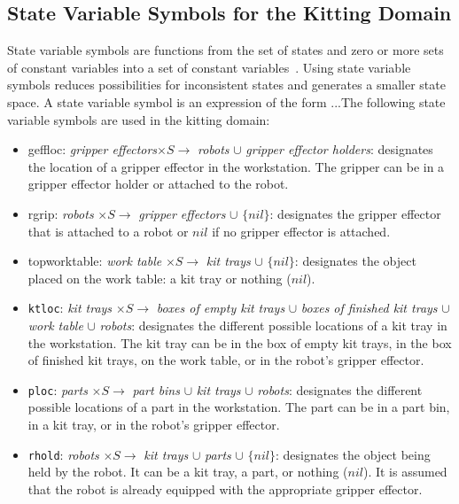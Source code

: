 \subsection{State Variable Symbols for the Kitting Domain}
State variable symbols are functions from the set of states and zero or more sets of constant variables into a set of constant variables~\cite{NAU.2004}. Using state variable symbols reduces possibilities for inconsistent states and generates a smaller state space. A state variable symbol is an expression of the form ...The following state variable symbols are used in the kitting domain:
\begin{itemize}
\item geffloc: \emph{gripper effectors}$\times S \rightarrow$ \emph{robots} $\cup$ \emph{gripper effector holders}: designates the location of a gripper effector in the workstation. The gripper can be in a gripper effector holder or attached to the robot.


\item rgrip: \emph{robots} $\times S \rightarrow$ \emph{gripper effectors} $\cup$ $\lbrace nil\rbrace$: designates the gripper effector that is attached to a robot or $nil$ if no gripper effector is attached.

\item topworktable: \emph{work table} $\times S \rightarrow$ \emph{kit trays} $\cup$ $\lbrace nil\rbrace$: designates the object placed on the work table: a kit tray or nothing ($nil$).

\item \texttt{ktloc}: \emph{kit trays} $\times S \rightarrow$ \emph{boxes of empty kit trays} $\cup$ \emph{boxes of finished kit trays} $\cup$ \emph{work table} $\cup$ \emph{robots}: designates the different possible locations of a kit tray in the workstation. The kit tray can be in the box of empty kit trays, in the box of finished kit trays, on the work table, or in the robot's gripper effector.

\item \texttt{ploc}: \emph{parts} $\times S \rightarrow$ \emph{part bins} $\cup$ \emph{kit trays} $\cup$ \emph{robots}: designates the different possible locations of a part in the workstation. The part can be in a part bin, in a kit tray, or in the robot's gripper effector.

\item \texttt{rhold}: \textit{robots} $\times S \rightarrow$ \textit{kit trays} $\cup$ \textit{parts} $\cup$ $\lbrace nil\rbrace$: designates the object being held by the robot. It can be a kit tray, a part, or nothing ($nil$). It is assumed that the robot is already equipped with the appropriate gripper effector.


\end{itemize}
